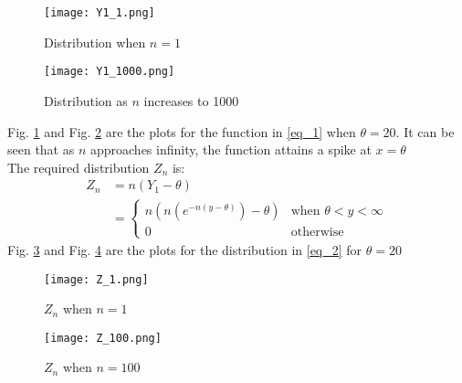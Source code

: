 \documentclass[journal,12pt,twocolumn]{IEEEtran}
\theoremstyle{remark}
\numberwithin{equation}{subsection}
\begin{document}
\begin{figure}[h]
    \centering
    \texttt{[image: Y1\_1.png]}
    \caption{Distribution when $n=1$}
    \label{fig:fig_1}
\end{figure}

\begin{figure}[h]
    \centering
    \texttt{[image: Y1\_1000.png]}
    \caption{Distribution as $n$ increases to 1000}
    \label{fig:fig_2}
\end{figure}
Fig. \ref{fig:fig_1} and Fig. \ref{fig:fig_2} are the plots for the function in \eqref{eq_1} when $\theta=20$. It can be seen that as $n$ approaches infinity, the function attains a spike at $x=\theta$ \\

The required distribution $Z_n$ is:
\begin{align}
    Z_n &= n(Y_1 - \theta)\\
    &=\label{eq_2}
    \begin{cases}
    n(n(e^{-n(y-\theta)})-\theta)&\text{when }\theta<y<\infty\\
    0 &\text{otherwise}
    \end{cases}
\end{align}
Fig. \ref{fig:fig_3} and Fig. \ref{fig:fig_4} are the plots for the distribution in \eqref{eq_2} for $\theta=20$
\begin{figure}[H]
    \centering
    \texttt{[image: Z\_1.png]}
    \caption{$Z_n$ when $n=1$}
    \label{fig:fig_3}
\end{figure}
\begin{figure}[H]
    \centering
    \texttt{[image: Z\_100.png]}
    \caption{$Z_n$ when $n=100$}
    \label{fig:fig_4}
\end{figure}
\end{document}
